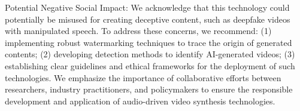 Potential Negative Social Impact: We acknowledge that this technology could potentially be misused for creating deceptive content, such as deepfake videos with manipulated speech. To address these concerns, we recommend: (1) implementing robust watermarking techniques to trace the origin of generated contents; (2) developing detection methods to identify AI-generated videos; (3) establishing clear guidelines and ethical frameworks for the deployment of such technologies. We emphasize the importance of collaborative efforts between researchers, industry practitioners, and policymakers to ensure the responsible development and application of audio-driven video synthesis technologies.
